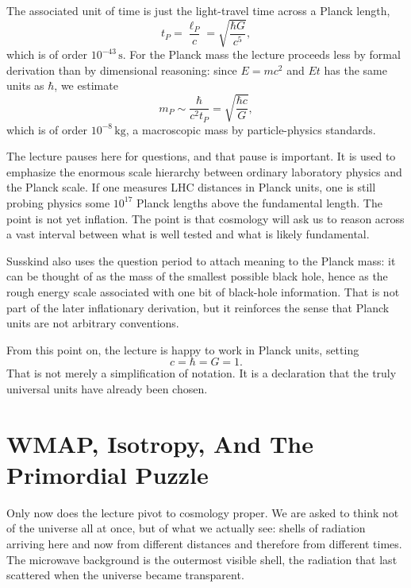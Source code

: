 The associated unit of time is just the light-travel time across a Planck length,
\begin{equation}
t_{P}=\frac{\ell_{P}}{c}=\sqrt{\frac{\hbar G}{c^{5}}},
\end{equation}
which is of order \(10^{-43}\,\mathrm{s}\). For the Planck mass the lecture proceeds less by formal derivation than by dimensional reasoning: since \(E=mc^{2}\) and \(Et\) has the same units as \(\hbar\), we estimate
\begin{equation}
m_{P}\sim \frac{\hbar}{c^{2}t_{P}}=\sqrt{\frac{\hbar c}{G}},
\end{equation}
which is of order \(10^{-8}\,\mathrm{kg}\), a macroscopic mass by particle-physics standards.

The lecture pauses here for questions, and that pause is important. It is used to emphasize the enormous scale hierarchy between ordinary laboratory physics and the Planck scale. If one measures LHC distances in Planck units, one is still probing physics some \(10^{17}\) Planck lengths above the fundamental length. The point is not yet inflation. The point is that cosmology will ask us to reason across a vast interval between what is well tested and what is likely fundamental.

\begin{remark}
Susskind also uses the question period to attach meaning to the Planck mass: it can be thought of as the mass of the smallest possible black hole, hence as the rough energy scale associated with one bit of black-hole information. That is not part of the later inflationary derivation, but it reinforces the sense that Planck units are not arbitrary conventions.
\end{remark}

From this point on, the lecture is happy to work in Planck units, setting
\begin{equation}
c=\hbar=G=1.
\end{equation}
That is not merely a simplification of notation. It is a declaration that the truly universal units have already been chosen.

\section{WMAP, Isotropy, And The Primordial Puzzle}

Only now does the lecture pivot to cosmology proper. We are asked to think not of the universe all at once, but of what we actually see: shells of radiation arriving here and now from different distances and therefore from different times. The microwave background is the outermost visible shell, the radiation that last scattered when the universe became transparent.

